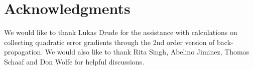 \section*{Acknowledgments}
We would like to thank Lukas Drude for the assistance with calculations on collecting quadratic error gradients through the 2nd order version of back-propagation. We would also like to thank Rita Singh, Abelino Jiminez, Thomas Schaaf and Don Wolfe for helpful discussions.
